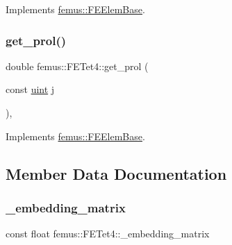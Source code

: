 Implements \mbox{\hyperlink{classfemus_1_1_f_e_elem_base_a0c4d6d5ec66bd4e301eb8ea2ef10f354}{femus\+::\+F\+E\+Elem\+Base}}.

\mbox{\label{classfemus_1_1_f_e_tet4_a28b82560cde667962c16ad58ec0def9c}} 
\subsubsection{\texorpdfstring{get\+\_\+prol()}{get\_prol()}}
{\footnotesize\ttfamily double femus\+::\+F\+E\+Tet4\+::get\+\_\+prol (\begin{DoxyParamCaption}\item[{const \mbox{\hyperlink{_typedefs_8hpp_a91ad9478d81a7aaf2593e8d9c3d06a14}{uint}}}]{j }\end{DoxyParamCaption})\hspace{0.3cm}{\ttfamily [inline]}, {\ttfamily [virtual]}}



Implements \mbox{\hyperlink{classfemus_1_1_f_e_elem_base_ac82326cdc7cb02329c7be9547d56fad4}{femus\+::\+F\+E\+Elem\+Base}}.



\subsection{Member Data Documentation}
\mbox{\label{classfemus_1_1_f_e_tet4_a23f530d1cb3b633f2180c9cfb7d9ee02}} 
\subsubsection{\texorpdfstring{\+\_\+embedding\+\_\+matrix}{\_embedding\_matrix}}
{\footnotesize\ttfamily const float femus\+::\+F\+E\+Tet4\+::\+\_\+embedding\+\_\+matrix\hspace{0.3cm}{\ttfamily [static]}}

\mbox{\label{classfemus_1_1_f_e_tet4_a2b801b1bb62bc02149acd7cdbcc6a69c}} 
